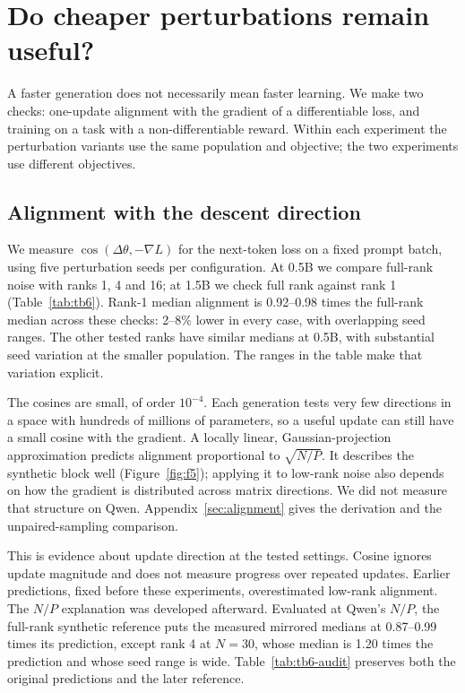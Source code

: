 \section{Do cheaper perturbations remain useful?}
\label{sec:quality}

A faster generation does not necessarily mean faster learning. We make two checks:
one-update alignment with the gradient of a differentiable loss, and training on a
task with a non-differentiable reward. Within each experiment the perturbation variants
use the same population and objective; the two experiments use different objectives.

\subsection{Alignment with the descent direction}



We measure $\cos(\Delta\theta,-\nabla L)$ for the next-token loss on a fixed prompt
batch, using five perturbation seeds per configuration. At 0.5B we compare full-rank
noise with ranks 1, 4 and 16; at 1.5B we check full rank against rank 1 (Table~\ref{tab:tb6}). Rank-1 median alignment is 0.92--0.98 times
the full-rank median across these checks: 2--8\% lower in every case, with overlapping
seed ranges. The other tested ranks have similar medians
at 0.5B, with substantial seed variation at the smaller population. The ranges in the
table make that variation explicit.

The cosines are small, of order $10^{-4}$. Each generation tests very few directions
in a space with hundreds of millions of parameters, so a useful update can still have
a small cosine with the gradient. A locally linear, Gaussian-projection approximation
predicts alignment proportional to $\sqrt{N/P}$. It describes the synthetic block well
(Figure~\ref{fig:f5}); applying it to low-rank noise also depends on how the gradient is
distributed across matrix directions. We did not measure that structure on Qwen.
Appendix~\ref{sec:alignment} gives the derivation and the unpaired-sampling comparison.

This is evidence about update direction at the tested settings. Cosine ignores update
magnitude and does not measure progress over repeated updates. Earlier predictions,
fixed before these experiments, overestimated low-rank alignment. The $N/P$ explanation
was developed afterward. Evaluated at Qwen's $N/P$, the full-rank synthetic reference
puts the measured mirrored medians at 0.87--0.99 times its prediction, except rank 4
at $N=30$, whose
median is 1.20 times the prediction and whose seed range is wide. Table~\ref{tab:tb6-audit} preserves both the original predictions
and the later reference.

